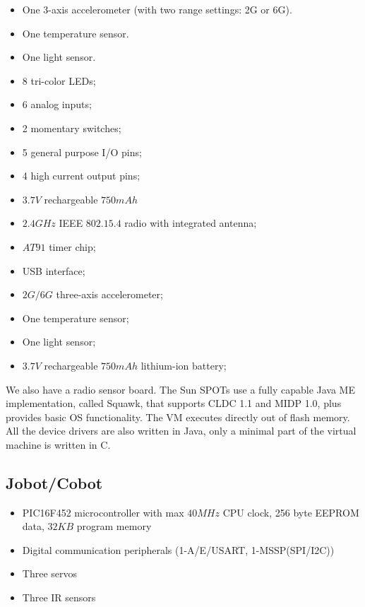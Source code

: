 \documentclass[a4paper,10pt]{article} %
\begin{document}
\begin{itemize}
    \item One 3-axis accelerometer (with two range settings: 2G or 6G).
    \item One temperature sensor.
    \item One light sensor.
    \item 8 tri-color LEDs;
    \item 6 analog inputs;
    \item 2 momentary switches;
    \item 5 general purpose I/O pins;
    \item 4 high current output pins;
    \item $3.7V$ rechargeable $750 mAh$
    \item $2.4 GHz$ IEEE $802.15.4$ radio with integrated antenna;
    \item $AT91$ timer chip;
    \item USB interface;
    \item $2G/6G$ three-axis accelerometer;
    \item One temperature sensor;
    \item One light sensor;
    \item $3.7V$ rechargeable $750 mAh$ lithium-ion battery;
\end{itemize}

We also have a radio sensor board. The Sun SPOTs use a fully capable Java ME
implementation, called Squawk, that supports CLDC 1.1 and MIDP 1.0, plus
provides basic OS functionality. The VM executes directly out of flash memory.
All the device drivers are also written in Java, only a minimal part of the
virtual machine is written in C.


\subsection{Jobot/Cobot} %
\label{app:cobot}

\begin{itemize}
    \item PIC16F452 microcontroller with max $40MHz$ CPU clock, 256 byte
    EEPROM data, $32KB$ program memory
    \item Digital communication peripherals (1-A/E/USART, 1-MSSP(SPI/I2C))
    \item Three servos
    \item Three IR sensors
\end{itemize}
\end{document}
